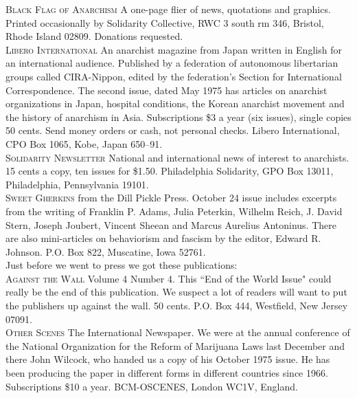 \documentclass[12pt, onecolumn, letterpaper, oneside]{book}
\begin{document}
\noindent\textsc{Black Flag of Anarchism} A one-page flier of news, quotations and graphics. Printed occasionally by Solidarity Collective, RWC 3 south rm 346, Bristol, Rhode Island 02809. Donations requested.\\

\noindent\textsc{Libero International} An anarchist magazine from Japan written in English for an international audience. Published by a federation of autonomous libertarian groups called CIRA-Nippon, edited by the federation's Section for International Correspondence. The second issue, dated May 1975 has articles on anarchist organizations in Japan, hospital conditions, the Korean anarchist movement and the history of anarchism in Asia. Subscriptions \$3 a year (six issues), single copies 50 cents. Send money orders or cash, not personal checks. Libero International, CPO Box 1065, Kobe, Japan 650--91.\\

\noindent\textsc{Solidarity Newsletter} National and international news of interest to anarchists. 15 cents a copy, ten issues for \$1.50. Philadelphia Solidarity, GPO Box 13011, Philadelphia, Pennsylvania 19101.\\

\noindent\textsc{Sweet Gherkins} from the Dill Pickle Press. October 24 issue includes excerpts from the writing of Franklin P. Adams, Julia Peterkin, Wilhelm Reich, J. David Stern, Joseph Joubert, Vincent Sheean and Marcus Aurelius Antoninus. There are also mini-articles on behaviorism and fascism by the editor, Edward R. Johnson. P.O. Box 822, Muscatine, Iowa 52761.\\

\noindent Just before we went to press we got these publications:\\

\noindent\textsc{Against the Wall} Volume 4 Number 4. This ``End of the World Issue" could really be the end of this publication. We suspect a lot of readers will want to put the publishers up against the wall. 50 cents. P.O. Box 444, Westfield, New Jersey 07091.\\

\noindent\textsc{Other Scenes} The International Newspaper. We were at the annual conference of the National Organization for the Reform of Marijuana Laws last December and there John Wilcock, who handed us a copy of his October 1975 issue. He has been producing the paper in different forms in different countries since 1966. Subscriptions \$10 a year. BCM-OSCENES, London WC1V, England.\\
\end{document}
